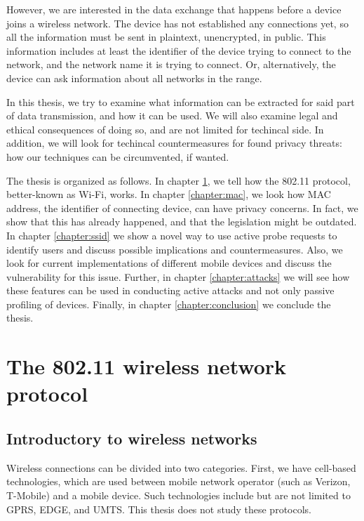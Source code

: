 \documentclass[12pt,a4paper,oneside,pdftex]{report}
\begin{document}
However, we are interested in the data exchange that happens before a device joins a wireless network. The device has not established any connections yet, so all the information must be sent in plaintext, unencrypted, in public. This information includes at least the identifier of the device trying to connect to the network, and the network name it is trying to connect. Or, alternatively, the device can ask information about all networks in the range.


In this thesis, we try to examine what information can be extracted for said part of data transmission, and how it can be used. We will also examine legal and ethical consequences of doing so, and are not limited for techincal side. In addition, we will look for techincal countermeasures for found privacy threats: how our techniques can be circumvented, if wanted.

The thesis is organized as follows. In chapter \ref{chapter:protocol}, we tell how the 802.11 protocol, better-known as Wi-Fi, works. In chapter \ref{chapter:mac}, we look how MAC address, the identifier of connecting device, can have privacy concerns. In fact, we show that this has already happened, and that the legislation might be outdated. In chapter \ref{chapter:ssid} we show a novel way to use active probe requests to identify users and discuss possible implications and countermeasures. Also, we look for current implementations of different mobile devices and discuss the vulnerability for this issue. Further, in chapter \ref{chapter:attacks} we will see how these features can be used in conducting active attacks and not only passive profiling of devices. Finally, in chapter \ref{chapter:conclusion} we conclude the thesis.



\chapter{The 802.11 wireless network protocol}
\label{chapter:protocol}


\section{Introductory to wireless networks}
\label{sec:intro_wireless}

Wireless connections can be divided into two categories. First, we have cell-based technologies, which are used between mobile network operator (such as Verizon, T-Mobile) and a mobile device. Such technologies include but are not limited to GPRS, EDGE, and UMTS. This thesis does not study these protocols.
\end{document}
